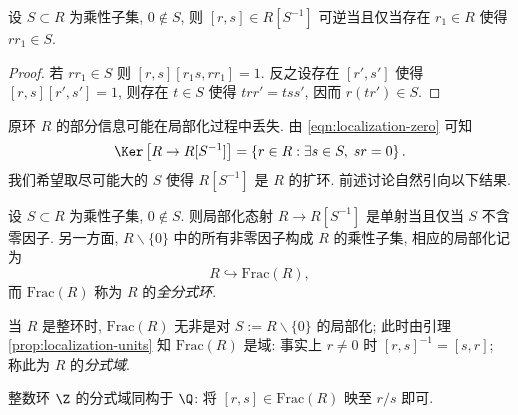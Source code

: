 \begin{lemma}\label{prop:localization-units}
	设 $S \subset R$ 为乘性子集, $0 \notin S$, 则 $[r,s] \in R[S^{-1}]$ 可逆当且仅当存在 $r_1 \in R$ 使得 $rr_1 \in S$.
\end{lemma}
\begin{proof}
	若 $rr_1 \in S$ 则 $[r,s] [r_1 s, rr_1] = 1$. 反之设存在 $[r',s']$ 使得 $[r,s][r',s'] = 1$, 则存在 $t \in S$ 使得 $trr' = tss'$, 因而 $r(tr') \in S$. 
\end{proof}

原环 $R$ 的部分信息可能在局部化过程中丢失. 由 \eqref{eqn:localization-zero} 可知
\[ \Ker \left[ R \to R[S^{-1}] \right] = \left\{r \in R : \exists s \in S, \; sr=0 \right\}. \]
我们希望取尽可能大的 $S$ 使得 $R[S^{-1}]$ 是 $R$ 的扩环. 前述讨论自然引向以下结果.
\begin{lemma}
	设 $S \subset R$ 为乘性子集, $0 \notin S$. 则局部化态射 $R \to R[S^{-1}]$ 是单射当且仅当 $S$ 不含零因子. 另一方面, $R \smallsetminus \{0\}$ 中的所有非零因子构成 $R$ 的乘性子集, 相应的局部化记为
	\[ R \hookrightarrow \text{Frac}(R), \]
	而 $\text{Frac}(R)$ 称为 $R$ 的\emph{全分式环}.
\end{lemma}
当 $R$ 是整环时, $\text{Frac}(R)$ 无非是对 $S := R \smallsetminus \{0\}$ 的局部化; 此时由引理 \ref{prop:localization-units} 知 $\text{Frac}(R)$ 是域: 事实上 $r \neq 0$ 时 $[r,s]^{-1} = [s,r]$; 称此为 $R$ 的\emph{分式域}. 

\begin{example}
	整数环 $\Z$ 的分式域同构于 $\Q$: 将 $[r,s] \in \text{Frac}(R)$ 映至 $r/s$ 即可.
\end{example}

